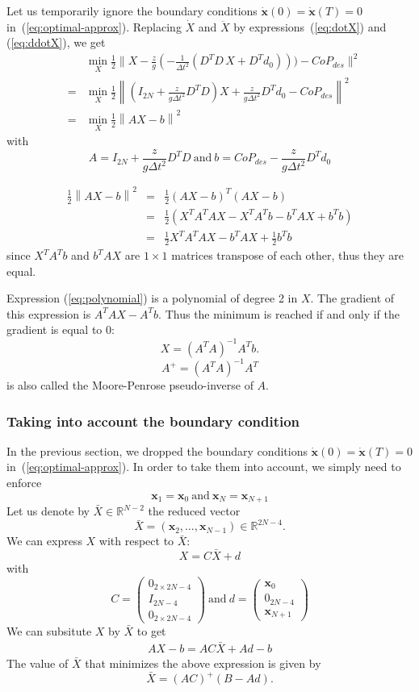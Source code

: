 \documentclass{article}
\newcommand\vect[1]{\mathbf{#1}}
\newcommand\x{\vect{x}}
\newcommand\dx{\vect{\dot{x}}}
\newcommand\reals{\mathbb{R}}
\newcommand\Xbar{\bar{X}}
\begin{document}
Let us temporarily ignore the boundary conditions $\dx(0)=\dx(T)=0$ in~(\ref{eq:optimal-approx}).
Replacing $\dot{X}$ and $\ddot{X}$ by expressions~(\ref{eq:dotX}) and (\ref{eq:ddotX}), we get
\begin{eqnarray*}
&&  \min_{X}\frac{1}{2}\|X - \frac{z}{g}(-\frac{1}{\Delta t^2} (D^TD\,X + D^Td_0))) - CoP_{des}\|^2\\
  &=&  \min_{X}\frac{1}{2}\left\|(I_{2N} + \frac{z}{g\Delta t^2}D^TD) X + \frac{z}{g\Delta t^2}D^Td_0 - CoP_{des}\right\|^2\\
  &=& \min_{X}\frac{1}{2}\left\| AX - b \right\|^2
\end{eqnarray*}
with
$$
A = I_{2N} + \frac{z}{g\Delta t^2}D^TD\ \mbox{and}\
  b = CoP_{des} - \frac{z}{g\Delta t^2}D^Td_0
$$

\begin{eqnarray}
  \frac{1}{2}\left\| AX - b \right\|^2 &=& \frac{1}{2}(AX - b)^T(AX - b)\\
  &=& \frac{1}{2}(X^T A^TAX - X^TA^T b - b^TAX + b^Tb)\\
  \label{eq:polynomial}
  &=& \frac{1}{2} X^T A^TAX -b^TAX + \frac{1}{2}b^Tb
\end{eqnarray}
since $X^TA^T b$ and $b^TAX$ are  $1\times 1$ matrices transpose of each other, thus they are equal.

Expression (\ref{eq:polynomial}) is a polynomial of degree 2 in $X$. The gradient of this
expression is $A^TAX -A^Tb$. Thus the minimum is reached if and only if the gradient is equal to 0:
$$
X = (A^TA)^{-1}A^Tb.
$$
$$
A^{+} = (A^TA)^{-1}A^T
$$
is also called the Moore-Penrose pseudo-inverse of $A$.

\subsubsection{Taking into account the boundary condition}

In the previous section, we dropped the boundary conditions $\dx(0)=\dx(T)=0$ in~(\ref{eq:optimal-approx}). In order to take them into account, we simply need to enforce
$$
\x_{1} = \x_{0}\ \mbox{and}\ \x_{N} = \x_{N+1}
$$
Let us denote by $\Xbar\in\reals^{N-2}$ the reduced vector
$$
\Xbar = (\x_2,...,\x_{N-1})\in\reals^{2N-4}.
$$
We can express $X$ with respect to $\Xbar$:
$$
X = C\Xbar + d
$$
with
$$
C = \left(\begin{array}{c}
  0_{2\times 2N-4}\\
  I_{2N-4}\\
  0_{2\times 2N-4}
\end{array}\right)\
\mbox{and}\ d=\left(\begin{array}{c}
  \x_0\\
  0_{2N-4}\\
  \x_{N+1}
\end{array}\right)
$$
We can subsitute $X$ by $\Xbar$ to get
\begin{eqnarray*}
  AX-b = AC\Xbar+Ad - b
\end{eqnarray*}
The value of $\Xbar$ that minimizes the above expression is given by
$$
\Xbar = (AC)^{+}(B-Ad).
$$
\end{document}
